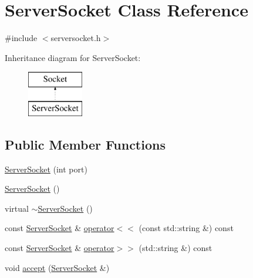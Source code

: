 \hypertarget{class_server_socket}{\section{Server\-Socket Class Reference}
\label{class_server_socket}
}


{\ttfamily \#include $<$serversocket.\-h$>$}

Inheritance diagram for Server\-Socket\-:\begin{figure}[H]
\begin{center}
\leavevmode
\includegraphics[height=2.000000cm]{class_server_socket}
\end{center}
\end{figure}
\subsection*{Public Member Functions}
\begin{DoxyCompactItemize}
\item 
\hyperlink{class_server_socket_a3dc1a31f740e4a8d69ae10c5dcb547d6}{Server\-Socket} (int port)
\item 
\hyperlink{class_server_socket_a2b3098589541243241ca25495155186c}{Server\-Socket} ()
\item 
virtual \hyperlink{class_server_socket_a510674d924c2544e6b0069e39c36516b}{$\sim$\-Server\-Socket} ()
\item 
const \hyperlink{class_server_socket}{Server\-Socket} \& \hyperlink{class_server_socket_ab5fe4b2d92d7014f7663c1bbacbbeda5}{operator$<$$<$} (const std\-::string \&) const 
\item 
const \hyperlink{class_server_socket}{Server\-Socket} \& \hyperlink{class_server_socket_a6bfabf01766bdb2c7f53274d8d771212}{operator$>$$>$} (std\-::string \&) const 
\item 
void \hyperlink{class_server_socket_ae550e314a988575d05b1dec1c3c18020}{accept} (\hyperlink{class_server_socket}{Server\-Socket} \&)
\end{DoxyCompactItemize}


